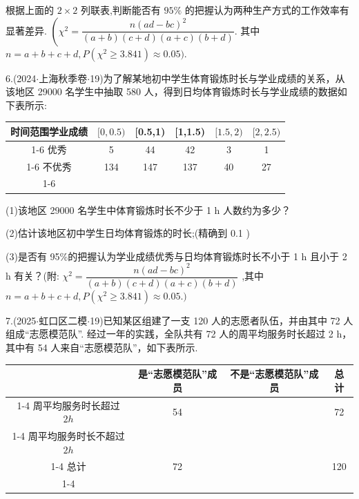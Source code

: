 根据上面的 $2 \times  2$ 列联表,判断能否有 ${95}\%$ 的把握认为两种生产方式的工作效率有显著差异. $\left( {{\chi }^{2} = \dfrac{n{\left( ad - bc\right) }^{2}}{\left( {a + b}\right) \left( {c + d}\right) \left( {a + c}\right) \left( {b + d}\right) }}\right.$. 其中 $n = a + b + c + d,P\left( {{\chi }^{2} \geq  {3.841}}\right)  \approx  {0.05})$.

6.(2024$\cdot$上海秋季卷$\cdot$19)为了解某地初中学生体育锻炼时长与学业成绩的关系，从该地区 29000 名学生中抽取 580 人，得到日均体育锻炼时长与学业成绩的数据如下表所示:

\begin{center}

\begin{tabular}{|c|c|c|c|c|c|}
\hline
时间范围学业成绩 & $\lbrack 0,{0.5})$ & [0.5,1) & [1,1.5) & $\lbrack {1.5},2)$ & $\lbrack 2,{2.5})$ \\
\cline{1-6}
优秀 & 5 & 44 & 42 & 3 & 1 \\
\cline{1-6}
不优秀 & 134 & 147 & 137 & 40 & 27 \\
\cline{1-6}
\hline
\end{tabular}
\end{center}

(1)该地区 29000 名学生中体育锻炼时长不少于 1 h 人数约为多少？

(2)估计该地区初中学生日均体育锻炼的时长;(精确到 0.1 )

(3)是否有 95\%的把握认为学业成绩优秀与日均体育锻炼时长不小于 1 h 且小于 2 h 有关？(附: ${\chi }^{2} = \dfrac{n{\left( ad - bc\right) }^{2}}{\left( {a + b}\right) \left( {c + d}\right) \left( {a + c}\right) \left( {b + d}\right) }$ ,其中 $n = a + b + c + d,P\left( {{\chi }^{2} \geq  {3.841}}\right)  \approx  {0.05}.)$

7.(2025$\cdot$虹口区二模$\cdot$19)已知某区组建了一支 120 人的志愿者队伍，并由其中 72 人组成“志愿模范队”. 经过一年的实践，全队共有 72 人的周平均服务时长超过 2 h，其中有 54 人来自“志愿模范队”，如下表所示.

\begin{center}

\begin{tabular}{|c|c|c|c|}
\hline
\phantom{X} & 是“志愿模范队”成员 & 不是“志愿模范队”成员 & 总计 \\
\cline{1-4}
周平均服务时长超过 $2{h}$ & 54 & \phantom{X} & 72 \\
\cline{1-4}
周平均服务时长不超过 $2{h}$ & \phantom{X} & \phantom{X} & \phantom{X} \\
\cline{1-4}
总计 & 72 & \phantom{X} & 120 \\
\cline{1-4}
\hline
\end{tabular}
\end{center}

